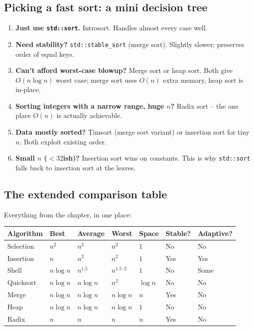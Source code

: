 \documentclass[11pt]{article}
\begin{document}
\subsection{Picking a fast sort: a mini decision tree}

\begin{ideabox}
\begin{enumerate}[leftmargin=*]
  \item \textbf{Just use \texttt{std::sort}.} Introsort. Handles
        almost every case well.
  \item \textbf{Need stability?} \texttt{std::stable\_sort} (merge
        sort). Slightly slower; preserves order of equal keys.
  \item \textbf{Can't afford worst-case blowup?} Merge sort or heap
        sort. Both give $O(n \log n)$ worst case; merge sort uses
        $O(n)$ extra memory, heap sort is in-place.
  \item \textbf{Sorting integers with a narrow range, huge $n$?}
        Radix sort -- the one place $O(n)$ is actually achievable.
  \item \textbf{Data mostly sorted?} Timsort (merge sort variant) or
        insertion sort for tiny $n$. Both exploit existing order.
  \item \textbf{Small $n$ ($< 32$ish)?} Insertion sort wins on
        constants. This is why \texttt{std::sort} falls back to
        insertion sort at the leaves.
\end{enumerate}
\end{ideabox}

\subsection{The extended comparison table}

Everything from the chapter, in one place:

\begin{center}
\footnotesize
\renewcommand{\arraystretch}{1.3}
\begin{tabular}{@{}p{2.2cm}p{1.6cm}p{1.6cm}p{1.6cm}p{1cm}p{1cm}p{1.6cm}@{}}
\hline
\textbf{Algorithm} & \textbf{Best} & \textbf{Average} & \textbf{Worst} & \textbf{Space} & \textbf{Stable?} & \textbf{Adaptive?} \\
\hline
Selection   & $n^2$       & $n^2$       & $n^2$       & $1$   & No  & No  \\
Insertion   & $n$         & $n^2$       & $n^2$       & $1$   & Yes & Yes \\
Shell       & $n \log n$  & $n^{1.5}$   & $n^{1.5\text{--}2}$ & $1$ & No  & Some \\
Quicksort   & $n \log n$  & $n \log n$  & $n^2$       & $\log n$ & No & No  \\
Merge       & $n \log n$  & $n \log n$  & $n \log n$  & $n$   & Yes & No  \\
Heap        & $n \log n$  & $n \log n$  & $n \log n$  & $1$   & No  & No  \\
Radix       & $n$         & $n$         & $n$         & $n$   & Yes & No  \\
\hline
\end{tabular}
\end{center}
\end{document}
